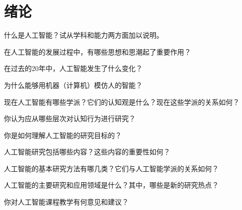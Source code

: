 \chapter{绪论}

\begin{question}
什么是人工智能？试从学科和能力两方面加以说明。
\end{question}	
\begin{solution}
\end{solution}

\begin{question}
在人工智能的发展过程中，有哪些思想和思潮起了重要作用？
\end{question}
\begin{solution}
\end{solution}

\begin{question}
在过去的20年中，人工智能发生了什么变化？
\end{question}
\begin{solution}
\end{solution}

\begin{question}
为什么能够用机器（计算机）模仿人的智能？
\end{question}
\begin{solution}
\end{solution}

\begin{question}
现在人工智能有哪些学派？它们的认知观是什么？现在这些学派的关系如何？
\end{question}
\begin{solution}
\end{solution}

\begin{question}
你认为应从哪些层次对认知行为进行研究？
\end{question}
\begin{solution}
\end{solution}

\begin{question}
你是如何理解人工智能的研究目标的？
\end{question}
\begin{solution}
\end{solution}

\begin{question}
人工智能研究包括哪些内容？这些内容的重要性如何？
\end{question}
\begin{solution}
\end{solution}

\begin{question}
人工智能的基本研究方法有哪几类？它们与人工智能学派的关系如何？
\end{question}
\begin{solution}
\end{solution}

\begin{question}
人工智能的主要研究和应用领域是什么？其中，哪些是新的研究热点？
\end{question}
\begin{solution}
\end{solution}

\begin{question}
你对人工智能课程教学有何意见和建议？
\end{question}
\begin{solution}
\end{solution}